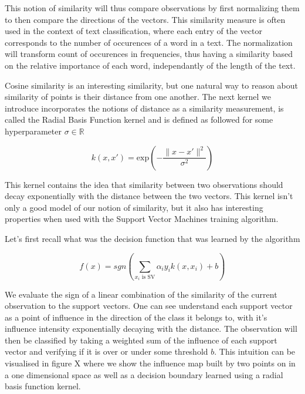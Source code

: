 This notion of similarity will thus compare observations by first normalizing them to then compare the directions of the vectors. This similarity measure is often used in the context of text classification, where each entry of the vector corresponds to the number of occurences of a word in a text. The normalization will transform count of occurences in frequencies, thus having a similarity based on the relative importance of each word, independantly of the length of the text.

Cosine similarity is an interesting similarity, but one natural way to reason about similarity of points is their distance from one another. The next kernel we introduce incorporates the notions of distance as a similarity measurement, is called the Radial Basis Function kernel and is defined as followed for some hyperparameter $\sigma \in \mathbb{R}$

\begin{equation*}
  k\left(x, x'\right) = \text{exp}\left(-\frac{\|x - x'\|^2}{\sigma^2}\right)
\end{equation*}

This kernel contains the idea that similarity between two observations should decay exponentially with the distance between the two vectors. This kernel isn't only a good model of our notion of similarity, but it also has interesting properties when used with the Support Vector Machines training algorithm.

Let's first recall what was the decision function that was learned by the algorithm

\begin{equation*}
  f\left(x\right) = sgn\left(\sum_{x_i \text{ is SV}}\alpha_iy_ik\left(x, x_i\right) + b\right)
\end{equation*}

We evaluate the sign of a linear combination of the similarity of the current observation to the support vectors. One can see understand each support vector as a point of influence in the direction of the class it belongs to, with it's influence intensity exponentially decaying with the distance. The observation will then be classified by taking a weighted sum of the influence of each support vector and verifying if it is over or under some threshold $b$. This intuition can be visualised in figure X where we show the influence map built by two points on in a one dimensional space as well as a decision boundary learned using a radial basis function kernel.



